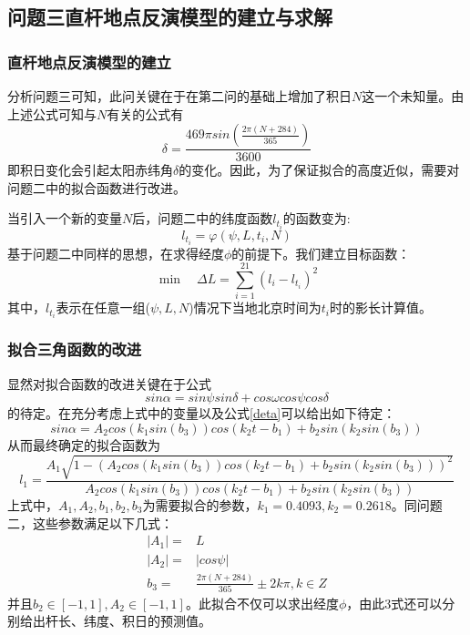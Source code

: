 \documentclass[12pt]{cumcmart}   %
\begin{document}
\subsection{问题三直杆地点反演模型的建立与求解}
\subsubsection{直杆地点反演模型的建立}
分析问题三可知，此问关键在于在第二问的基础上增加了积日$N$这一个未知量。由上述公式可知与$N$有关的公式有\[\delta=\frac{469\pi sin(\frac{2\pi(N+284)}{365})}{3600}  \]
即积日变化会引起太阳赤纬角$\delta$的变化。因此，为了保证拟合的高度近似，需要对问题二中的拟合函数进行改进。

当引入一个新的变量$N$后，问题二中的纬度函数$l_{t_i}$的函数变为:
\begin{equation}
l_{t_i}=\varphi(\psi,L,t_i,N)
\end{equation}
基于问题二中同样的思想，在求得经度$\phi$的前提下。我们建立目标函数：
\[\min \quad \Delta L = \sum\limits_{i = 1}^{21} ({l_i}-l_{t_i})^2\]
其中，$l_{t_i}$表示在任意一组($\psi,L,N$)情况下当地北京时间为$t_i$时的影长计算值。
\subsubsection{拟合三角函数的改进}
显然对拟合函数的改进关键在于公式\[sin \alpha=sin \psi sin\delta +cos \omega cos \psi cos \delta \]
的待定。在充分考虑上式中的变量以及公式\ref{deta}可以给出如下待定：
\begin{equation}
sin\alpha=A_2cos(k_1sin(b_3))cos(k_2 t-b_1)+b_2sin(k_2sin(b_3))
\end{equation}
从而最终确定的拟合函数为
\begin{equation}
l_1=\frac{A_1\sqrt{1-(A_2cos(k_1sin(b_3))cos(k_2 t-b_1)+b_2sin(k_2sin(b_3)))^2}}{A_2cos(k_1sin(b_3))cos(k_2 t-b_1)+b_2sin(k_2sin(b_3))}
\end{equation}
上式中，$A_1,A_2,b_1,b_2,b_3$为需要拟合的参数，$k_1=0.4093,k_2=0.2618$。同问题二，这些参数满足以下几式：
\begin{align}
|A_1|=&L  \\
|A_2|=&|cos\psi|  \\
b_3=&\frac{2\pi (N+284)}{365}\pm 2k\pi  ,k \in Z
\end{align}
并且$b_2\in[-1,1],A_2 \in [-1,1]$。此拟合不仅可以求出经度$\phi$，由此3式还可以分别给出杆长、纬度、积日的预测值。
\end{document}
